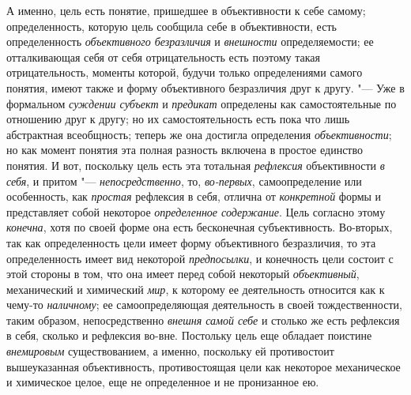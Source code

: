 {{А именно, цель есть понятие, пришедшее в объективности к себе
самому; определенность, которую цель сообщила себе в объективности, есть
определенность {\em объективного
безразличия} и
{\em внешности}
определяемости; ее отталкивающая себя от себя отрицательность
есть поэтому такая отрицательность, моменты которой, будучи только
определениями самого понятия, имеют также и форму объективного безразличия
друг к другу. "--- Уже в формальном
{\em суждении субъект} и
{\em предикат} определены
как самостоятельные по отношению друг к другу; но их самостоятельность есть
пока что лишь абстрактная всеобщность; теперь же она достигла определения
{\em объективности}; но
как момент понятия эта полная разность включена в простое единство понятия.
И вот, поскольку цель есть эта тотальная
{\em рефлексия}
объективности {\em в
себя}, и притом
"--- {\em непосредственно},
то, {\em во-первых},
самоопределение или особенность, как
{\em простая} рефлексия в
себя, отлична от {\em конкретной}
формы и представляет собой некоторое
{\em определенное содержание}.
Цель согласно этому
{\em конечна}, хотя по
своей форме она есть бесконечная субъективность. Во-вторых, так как
определенность цели имеет форму объективного безразличия, то эта
определенность имеет вид некоторой
{\em предпосылки}, и
конечность цели состоит с этой стороны в том, что она имеет перед собой
некоторый {\em объективный},
механический и химический
{\em мир}, к которому ее
деятельность относится как к чему-то
{\em наличному}; ее
самоопределяющая деятельность в своей тождественности, таким образом,
непосредственно {\em внешня самой себе}
и столько же есть рефлексия в себя, сколько и рефлексия
во-вне. Постольку цель еще обладает поистине
{\em внемировым}
существованием, а именно, поскольку ей противостоит
вышеуказанная объективность, противостоящая цели как
некоторое механическое и химическое целое, еще не определенное и не
пронизанное ею.

}}
